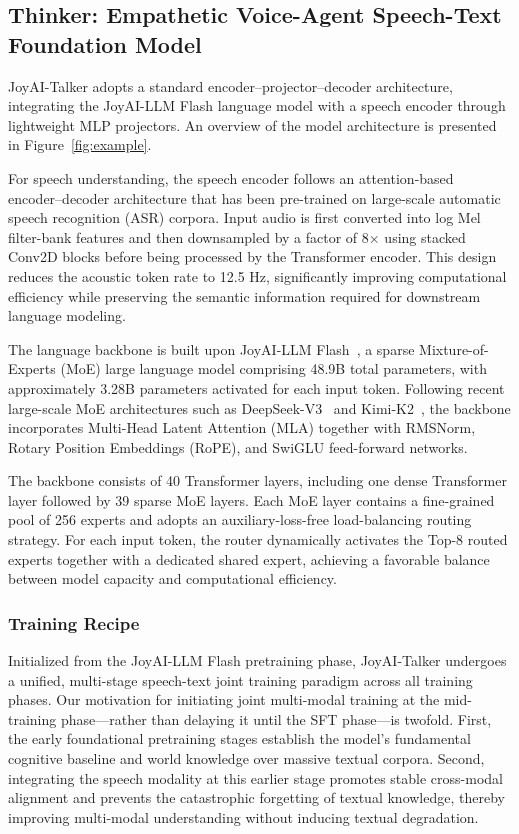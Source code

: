 \subsection{Thinker: Empathetic Voice-Agent Speech-Text Foundation Model}

JoyAI-Talker adopts a standard encoder–projector–decoder architecture, integrating the JoyAI-LLM Flash language model with a speech encoder through lightweight MLP projectors. An overview of the model architecture is presented in Figure~\ref{fig:example}.

For speech understanding, the speech encoder follows an attention-based encoder–decoder architecture that has been pre-trained on large-scale automatic speech recognition (ASR) corpora. Input audio is first converted into log Mel filter-bank features and then downsampled by a factor of 8× using stacked Conv2D blocks before being processed by the Transformer encoder. This design reduces the acoustic token rate to 12.5 Hz, significantly improving computational efficiency while preserving the semantic information required for downstream language modeling.

The language backbone is built upon JoyAI-LLM Flash~\cite{cai2026joyaillmflashadvancingmidscale}, a sparse Mixture-of-Experts (MoE) large language model comprising 48.9B total parameters, with approximately 3.28B parameters activated for each input token. Following recent large-scale MoE architectures such as DeepSeek-V3~\cite{deepseekai2025deepseekv3technicalreport} and Kimi-K2~\cite{kimiteam2026kimik2openagentic}, the backbone incorporates Multi-Head Latent Attention (MLA) together with RMSNorm, Rotary Position Embeddings (RoPE), and SwiGLU feed-forward networks.

The backbone consists of 40 Transformer layers, including one dense Transformer layer followed by 39 sparse MoE layers. Each MoE layer contains a fine-grained pool of 256 experts and adopts an auxiliary-loss-free load-balancing routing strategy. For each input token, the router dynamically activates the Top-8 routed experts together with a dedicated shared expert, achieving a favorable balance between model capacity and computational efficiency.

\subsubsection{Training Recipe}

Initialized from the JoyAI-LLM Flash pretraining phase, JoyAI-Talker undergoes a unified, multi-stage speech-text joint training paradigm across all training phases. Our motivation for initiating joint multi-modal training at the mid-training phase—rather than delaying it until the SFT phase—is twofold. First, the early foundational pretraining stages establish the model's fundamental cognitive baseline and world knowledge over massive textual corpora. Second, integrating the speech modality at this earlier stage promotes stable cross-modal alignment and prevents the catastrophic forgetting of textual knowledge, thereby improving multi-modal understanding without inducing textual degradation. 

